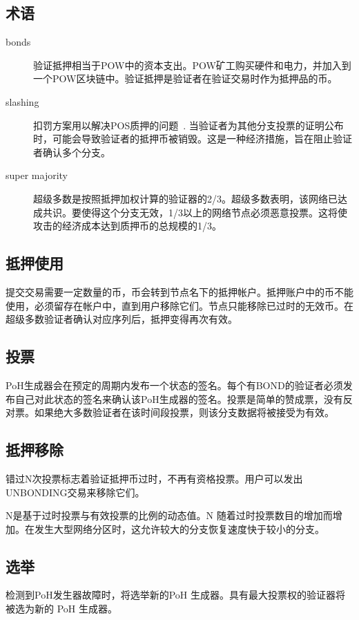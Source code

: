 \documentclass[12pt, uft8]{ctexart}
\begin{document}
\subsection{术语}
\begin{description}

\item[bonds]
验证抵押相当于POW中的资本支出。POW矿工购买硬件和电力，并加入到一个POW区块链中。验证抵押是验证者在验证交易时作为抵押品的币。

\item[slashing]

扣罚方案用以解决POS质押的问题~\cite{slasher}. 当验证者为其他分支投票的证明公布时，可能会导致验证者的抵押币被销毁。这是一种经济措施，旨在阻止验证者确认多个分支。
\item[super majority]
超级多数是按照抵押加权计算的验证器的2/3。超级多数表明，该网络已达成共识。要使得这个分支无效，1/3以上的网络节点必须恶意投票。这将使攻击的经济成本达到质押币的总规模的1/3。   

\end{description}

\subsection{抵押使用}
提交交易需要一定数量的币，币会转到节点名下的抵押帐户。抵押账户中的币不能使用，必须留存在帐户中，直到用户移除它们。节点只能移除已过时的无效币。在超级多数验证者确认对应序列后，抵押变得再次有效。

\subsection{投票}
PoH生成器会在预定的周期内发布一个状态的签名。每个有BOND的验证者必须发布自己对此状态的签名来确认该PoH生成器的签名。投票是简单的赞成票，没有反对票。如果绝大多数验证者在该时间段投票，则该分支数据将被接受为有效。

\subsection{抵押移除}

错过N次投票标志着验证抵押币过时，不再有资格投票。用户可以发出UNBONDING交易来移除它们。

N是基于过时投票与有效投票的比例的动态值。N 随着过时投票数目的增加而增加。在发生大型网络分区时，这允许较大的分支恢复速度快于较小的分支。

\subsection{选举}\label{subsec:elections}
检测到PoH发生器故障时，将选举新的PoH 生成器。具有最大投票权的验证器将被选为新的 PoH 生成器。
\end{document}
